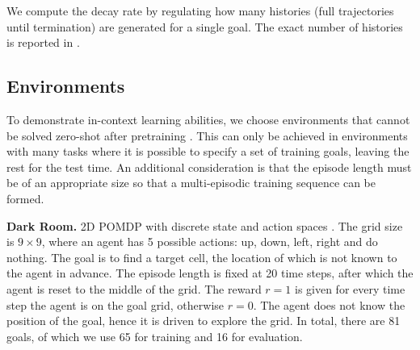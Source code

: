 \documentclass{article}
\theoremstyle{plain}
\theoremstyle{definition}
\theoremstyle{remark}
\begin{document}
We compute the decay rate by regulating how many histories (full trajectories until termination) are generated for a single goal. The exact number of histories is reported in .


\subsection{Environments}
\label{sec:env}
To demonstrate in-context learning abilities, we choose environments that cannot be solved zero-shot after pretraining \cite{laskin2022context, lee2023supervised}. This can only be achieved in environments with many tasks where it is possible to specify a set of training goals, leaving the rest for the test time. An additional consideration is that the episode length must be of an appropriate size so that a multi-episodic training sequence can be formed.


\textbf{Dark Room.} 2D POMDP with discrete state and action spaces \cite{laskin2022context}. The grid size is $9 \times 9$, where an agent has 5 possible actions: up, down, left, right and do nothing. The goal is to find a target cell, the location of which is not known to the agent in advance. The episode length is fixed at 20 time steps, after which the agent is reset to the middle of the grid. The reward $r=1$ is given for every time step the agent is on the goal grid, otherwise $r=0$. The agent does not know the position of the goal, hence it is driven to explore the grid. In total, there are 81 goals, of which we use 65 for training and 16 for evaluation.

\end{document}
